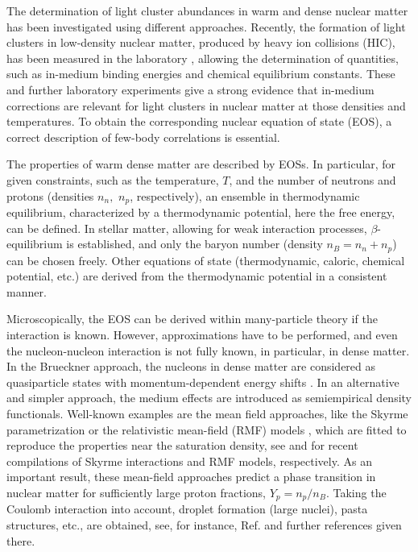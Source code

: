 \documentclass[aps,prc,nofootinbib,twocolumn,showpacs]{revtex4-1}
\begin{document}
The determination of light cluster abundances in warm and dense 
nuclear matter has been investigated using different approaches.
Recently, the formation of light clusters in low-density nuclear
matter, produced by heavy ion collisions (HIC), has been measured 
in the laboratory \cite{hagel12,qin12},
allowing the determination of quantities, such as in-medium
binding energies and chemical equilibrium constants. These and further
laboratory experiments give a strong evidence that in-medium
corrections are relevant for light clusters in nuclear matter at those densities and
temperatures. To obtain the corresponding nuclear equation of state
(EOS), a correct description of few-body correlations is essential.


The properties of warm dense matter are described by EOSs. 
In particular, for given constraints, such as the
temperature, $T$, and the number of neutrons and protons (densities
$n_n,\,\,n_p$, respectively), an ensemble in  thermodynamic
equilibrium, characterized by a thermodynamic potential, here the free
energy, can be defined. In stellar matter, allowing for weak
interaction processes,  $\beta$-equilibrium is established, and only
the baryon number (density $n_B=n_n+n_p$) can be chosen freely.
Other equations of state (thermodynamic, caloric, chemical potential, etc.) 
are derived from the thermodynamic potential in a consistent manner. 

Microscopically, the EOS can be derived within many-particle theory if
the interaction is known. However, approximations have to be
performed, and even the nucleon-nucleon interaction is not fully known,
in particular, in dense matter.
In the Brueckner approach, the nucleons in dense
matter are considered as quasiparticle states with momentum-dependent
energy shifts \cite{bhf}. In an alternative and simpler approach, 
the medium effects are introduced as semiempirical density functionals. 
Well-known examples are the  mean field approaches, like the Skyrme
parametrization  \cite{walecka,shf}
or the relativistic mean-field (RMF) models \cite{walecka,rmf,fsu,typel10}, which are fitted to reproduce 
the properties near the saturation density, see \cite{dutra1} and
\cite{dutra2} for recent compilations of Skyrme interactions and RMF
models, respectively.  As an important result, 
these mean-field approaches predict a phase transition in nuclear matter 
for sufficiently large proton fractions, $Y_p=n_p/n_B$.
Taking the Coulomb interaction into account, droplet formation (large nuclei), 
pasta structures, etc., are obtained, see, for instance, Ref. \cite{PCP15} 
and further references given there. 
\end{document}

